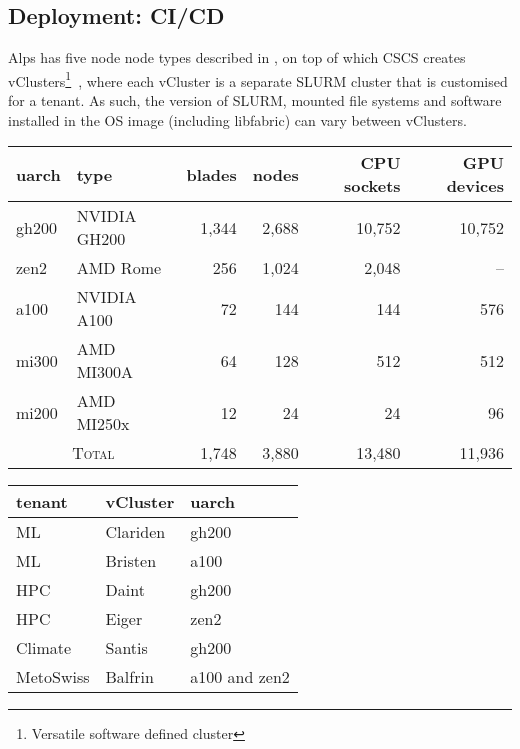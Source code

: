 \subsection{Deployment: CI/CD}

Alps has five node node types described in , on top of which CSCS creates vClusters\footnote{Versatile software defined cluster}~\cite{vClusters2023}, where each vCluster is a separate SLURM cluster that is customised for a tenant.
As such, the version of SLURM, mounted file systems and software installed in the OS image (including libfabric) can vary between vClusters.

\begin{table*}[!htb]
    \begin{minipage}{0.6\textwidth}
        \centering
        \begin{tabular}{llrrrr}
        \toprule
        uarch   & type         & blades & nodes & CPU sockets & GPU devices \\
        \midrule
        gh200   & NVIDIA GH200 & 1,344   & 2,688  & 10,752      & 10,752      \\
        zen2    & AMD Rome     & 256     & 1,024  & 2,048       & --          \\
        a100    & NVIDIA A100  & 72      & 144    & 144         & 576         \\
        mi300   & AMD MI300A   & 64      & 128    & 512         & 512         \\
        mi200   & AMD MI250x   & 12      & 24     & 24          & 96          \\
        \midrule
        \multicolumn{2}{c}{\textsc{Total}}      & 1,748   & 3,880  & 13,480  & 11,936 \\
        \bottomrule
        \end{tabular}
    \end{minipage}%
    \begin{minipage}{0.4\textwidth}
        \centering
        \begin{tabular}{lll}
        \toprule
        tenant   & vCluster & uarch         \\
        \midrule
            ML      & Clariden & gh200 \\
            ML      & Bristen  & a100 \\
            HPC     & Daint    & gh200 \\
            HPC     & Eiger    & zen2 \\
            Climate & Santis   & gh200  \\
            MetoSwiss & Balfrin   & a100 and zen2  \\
        \bottomrule
        \end{tabular}
    \end{minipage}
    \caption{Alps node types and their specifications (left), and examples of vClusters provided to tenants (right).}
\label{tab:alps-nodes}
\end{table*}

